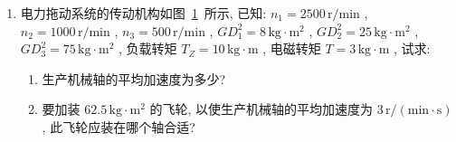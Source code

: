 \documentclass[lang=cn,11pt,marginpar=margintrue]{elegantbook}%
\newcommand{\zt}[1]{\,\mathrm{#1}}
\newcommand{\NN}{\mathrm{N}}
\begin{document}
\begin{enumerate}
\begin{solution}
\begin{enumerate}
						\begin{enumerate}
							\item 理想空载转速 $n_0=1056\zt{r/min}$
							\item $T=T_{\NN}$ 时电动机的转速 $n_{R\NN}$
								\begin{equation*}
									\elegantpar{n_{R\NN}=n_0-\frac{R_a+R_C}{9.55( C_E \varPhi_{\NN})^2}T_{\NN}}{ref: 课本 P79 式(2.73)}=1056-\frac{0.038+0.5}{9.55 \times 0.2084^{2}} \times 607=268\zt{r/min}
								\end{equation*}
								通过( $n_0=1056\zt{r/min}$ , $T=0$ )及( $n=n_{R\NN}=268\zt{r/min}$ , $T_{\NN}=607\zt{N\cdot m}$ )两点连一直线, 即得 $R_C=0.5\Omega$ 的人为机械特性, 如图~\ref{tu:2}~直线 $2$ .
						\end{enumerate}
				\end{enumerate}
				\begin{figure}[htbp]
					\centering
					\texttt{[image: tu2]}
					\caption{机械特性曲线}\label{tu:2}
					\quad
					\parbox[b]{0.4\textwidth}{
					\texttt{[image: tu4]}}
			\caption{传动机构图}\label{tu:7}
				\end{figure}
			\end{solution}
	\item \label{js:2}电力拖动系统的传动机构如图~\ref{tu:7}~所示, 已知: $n_1=2500\zt{r/min}$ , $n_2=1000\zt{r/min}$ , $n_3=500\zt{r/min}$ , $GD_1^2=8\zt{kg\cdot m^2}$ , $GD_2^2=25\zt{kg\cdot m^2}$ , $GD_3^2=75\zt{kg\cdot m^2}$ , 负载转矩 $T_Z=10\zt{kg\cdot m}$ , 电磁转矩 $T=3\zt{kg\cdot m}$ , 试求:
		\begin{enumerate}
			\item 生产机械轴的平均加速度为多少?
			\item 要加装 $62.5\zt{kg\cdot m^2}$ 的飞轮, 以使生产机械轴的平均加速度为 $3 \zt{r/(min\cdot s)}$ , 此飞轮应装在哪个轴合适?
		\end{enumerate}
			

\end{enumerate}
\end{document}
